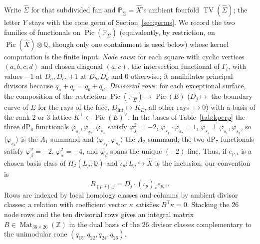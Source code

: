 \documentclass[11pt]{amsart}
\theoremstyle{definition}
\theoremstyle{remark}
\theoremstyle{plain}
\newcommand{\ZZ}{\mathbb{Z}}
\newcommand{\QQ}{\mathbb{Q}}
\newcommand{\PP}{\mathbb{P}}
\newcommand{\Pic}{\operatorname{Pic}}
\newcommand{\TV}{\operatorname{TV}}
\newcommand{\dP}{\mathrm{dP}}
\newcommand{\Xh}{\widehat{X}}
\begin{document}
Write $\widehat\Sigma$ for that subdivided fan and $\PP_{\widehat\Sigma}=\Xh$'s
ambient fourfold $\TV(\widehat\Sigma)$; the letter $Y$ stays with the cone germ
of Section~\ref{sec:germs}.  We record the two families of functionals on
$\Pic(\PP_{\widehat\Sigma})$
(equivalently, by restriction, on $\Pic(\Xh)\otimes\QQ$, though only
one containment is used below) whose kernel computation is the finite
input.  \emph{Node rows}: for each square with cyclic vertices
$(a,b,c,d)$ and chosen diagonal $(a,c)$, the intersection functional
of $\Gamma_i$, with values $-1$ at $D_a,D_c$, $+1$ at $D_b,D_d$ and
$0$ otherwise; it annihilates principal divisors because
$q_a+q_c=q_b+q_d$.  \emph{Divisorial rows}: for each exceptional
surface, the composition of the restriction
$\Pic(\PP_{\widehat\Sigma})\to\Pic(E)$ ($D_j\mapsto$ the boundary curve of $E$ for the
rays of the face, $D_{\mathrm{int}}\mapsto K_E$, all other rays
$\mapsto0$) with a basis of the rank-$2$ or $3$ lattice
$K^{\perp}\subset\Pic(E)^{\vee}$.  In the bases of
Table~\ref{tab:kperp} the three $\dP_6$ functionals
$\varphi_{s_1},\varphi_{s_2},\varphi_{s_3}$ satisfy
$\varphi_{s_i}^2=-2$, $\varphi_{s_1}\cdot\varphi_{s_2}=1$,
$\varphi_{s_3}\perp\varphi_{s_1},\varphi_{s_2}$, so
$\langle\varphi_{s_3}\rangle$ is the $A_1$ summand and
$\langle\varphi_{s_1},\varphi_{s_2}\rangle$ the $A_2$ summand; the
two $\dP_7$ functionals satisfy $\varphi_\beta^2=-2$,
$\varphi_\alpha^2=-4$, and $\varphi_\beta$ spans the unique
$(-2)$-line.  Thus, if $e_{p,i}$ is a chosen basis class of $H_2(L_p;\QQ)$
and $\iota_p\colon L_p\hookrightarrow\Xh$ is the inclusion, our convention is
\[
B_{(p,i),j}=D_j\cdot(\iota_p)_*e_{p,i}.
\]
Rows are indexed by local homology classes and columns by ambient divisor
classes; a relation with coefficient vector $\kappa$ satisfies
$B^{\mathsf T}\kappa=0$.
Stacking the $26$ node rows and the ten divisorial rows
gives an integral matrix
$B\in\operatorname{Mat}_{36\times26}(\ZZ)$ in the dual basis of the
$26$ divisor classes complementary to the unimodular cone
$(q_{15},q_{22},q_{24},q_{26})$.
\end{document}
